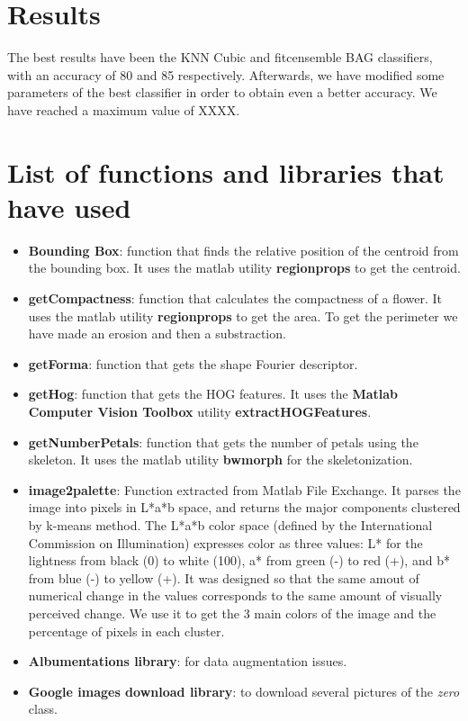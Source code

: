 \documentclass[11]{article}
\begin{document}
\section{Results}
\label{sec:results}

The best results have been the KNN Cubic and fitcensemble BAG classifiers, with an accuracy of 80 and 85 respectively. Afterwards, we have modified some parameters of the best classifier in order to obtain even a better accuracy. We have reached a maximum value of XXXX.

\section{List of functions and libraries that have used}
\begin{itemize}
\item \textbf{Bounding Box}: function that finds the relative position of the centroid from the bounding box. It uses the matlab utility \textbf{regionprops} to get the centroid.
\item \textbf{getCompactness}: function that calculates the compactness of a flower. It uses the matlab utility \textbf{regionprops} to get the area. To get the perimeter we have made an erosion and then a substraction. 
\item \textbf{getForma}: function that gets the shape Fourier descriptor. 
\item \textbf{getHog}: function that gets the HOG features. It uses the \textbf{Matlab Computer Vision Toolbox} utility \textbf{extractHOGFeatures}.
\item \textbf{getNumberPetals}: function that gets the number of petals using the skeleton. It uses the matlab utility \textbf{bwmorph} for the skeletonization. 

\item \textbf{image2palette}\cite{image2palette}: Function extracted from Matlab File Exchange. It parses the image into pixels in L*a*b space, and returns the major components clustered by k-means method. The L*a*b color space (defined by the International Commission on Illumination) expresses color as three values: L* for the lightness from black (0) to white (100), a* from green (-) to red (+), and b* from blue (-) to yellow (+). It was designed so that the same amout of numerical change in the values corresponds to the same amount of visually perceived change. We use it to get the 3 main colors of the image and the percentage of pixels in each cluster.

\item \textbf{Albumentations library}: for data augmentation issues.
\item \textbf{Google images download library}: to download several pictures of the \textit{zero} class.
\end{itemize}
\end{document}
